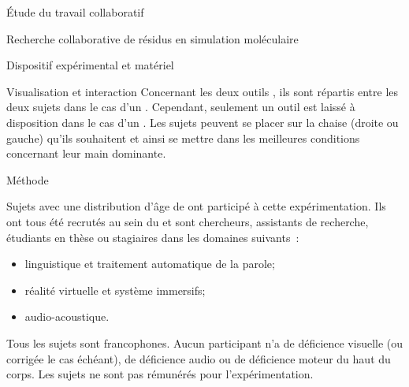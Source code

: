\documentclass[myfrancais]{mythesis}
\begin{document}
\begin{mypart}{Étude du travail collaboratif}
\begin{mychapter}{Recherche collaborative de résidus en simulation moléculaire}
\begin{mysection}{Dispositif expérimental et matériel}
\begin{mysubsection}{Visualisation et interaction}
					Concernant les deux outils , ils sont répartis entre les deux sujets dans le cas d'un .
					Cependant, seulement un outil  est laissé à disposition dans le cas d'un .
					Les sujets peuvent se placer sur la chaise (droite ou gauche) qu'ils souhaitent et ainsi se mettre dans les meilleures conditions concernant leur main dominante.
				\end{mysubsection}
			\end{mysection}
			\begin{mysection}{Méthode}
				\begin{mysubsection}[sse-exp1-Sujets]{Sujets}
					 avec une distribution d'âge de  ont participé à cette expérimentation.
					Ils ont tous été recrutés au sein du  et sont chercheurs, assistants de recherche, étudiants en thèse ou stagiaires dans les domaines suivants~:
					\begin{itemize}
						\item linguistique et traitement automatique de la parole;
						\item réalité virtuelle et système immersifs;
						\item audio-acoustique.
					\end{itemize}

					Tous les sujets sont francophones.
					Aucun participant n'a de déficience visuelle (ou corrigée le cas échéant), de déficience audio ou de déficience moteur du haut du corps.
					Les sujets ne sont pas rémunérés pour l'expérimentation.


\end{mysubsection}
\end{mysection}
\end{mychapter}
\end{mypart}
\end{document}
